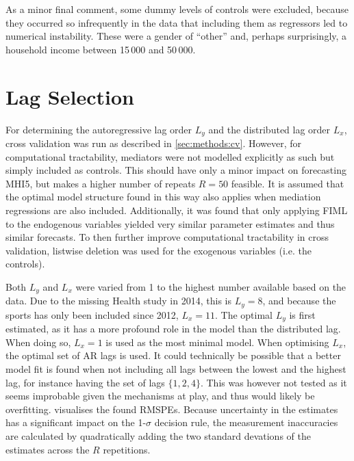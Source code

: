 As a minor final comment, some dummy levels of controls were excluded, because they occurred so infrequently in the data
that including them as regressors led to numerical instability.
These were a gender of ``other'' and, perhaps surprisingly, a household income between 15\,000 and 50\,000.

\section{Lag Selection}
\label{sec:modelling:lags}
For determining the autoregressive lag order $L_y$ and the distributed lag order $L_x$, cross validation was run as
described in \cref{sec:methods:cv}.
However, for computational tractability, mediators were not modelled explicitly as such but simply included as controls.
This should have only a minor impact on forecasting MHI5, but makes a higher number of repeats $R = 50$ feasible.
It is assumed that the optimal model structure found in this way also applies when mediation regressions are also
included.
Additionally, it was found that only applying FIML to the endogenous variables yielded very similar parameter estimates
and thus similar forecasts. To then further improve computational tractability in cross validation, listwise deletion
was used for the exogenous variables (i.e. the controls).

Both $L_y$ and $L_x$ were varied from 1 to the highest number available based on the data.
Due to the missing Health study in 2014, this is $L_y = 8$, and because the sports has only been included since 2012,
$L_x = 11$.
The optimal $L_y$ is first estimated, as it has a more profound role in the model than the distributed lag.
When doing so, $L_x = 1$ is used as the most minimal model. When optimising $L_x$, the optimal set of AR lags is used.
It could technically be possible that a better model fit is found when not including all lags between the lowest
and the highest lag, for instance having the set of lags $\{1, 2, 4\}$. This was however not tested as it seems improbable
given the mechanisms at play, and thus would likely be overfitting.
 visualises the found RMSPEs. Because uncertainty in the estimates has a significant impact
on the 1-$\sigma$ decision rule, the measurement inaccuracies are calculated by quadratically adding the two standard
devations of the estimates across the $R$ repetitions.

